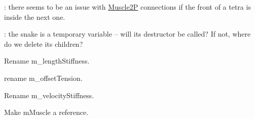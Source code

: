 \begin{DoxyRefList}
\-: there seems to be an issue with \hyperlink{class_muscle2_p}{Muscle2\-P} connections if the front of a tetra is inside the next one. 

\-: the snake is a temporary variable -- will its destructor be called? If not, where do we delete its children?  
\item[\label{todo__todo000003}%
\hypertarget{todo__todo000003}{}%
Member \hyperlink{class_impedance_control_a1c4d6e99303cc3e6934658db166de7ff}{Impedance\-Control\-:\-:\-\_\-length\-Stiffness} ]Rename m\-\_\-length\-Stiffness.  
\item[\label{todo__todo000002}%
\hypertarget{todo__todo000002}{}%
Member \hyperlink{class_impedance_control_a2c5a6ed274fdd9f44708c5c74c520bd7}{Impedance\-Control\-:\-:\-\_\-offset\-Tension} ]rename m\-\_\-offset\-Tension.  
\item[\label{todo__todo000004}%
\hypertarget{todo__todo000004}{}%
Member \hyperlink{class_impedance_control_af5bf17d7b651e84912e666b3bc3a25e4}{Impedance\-Control\-:\-:\-\_\-vel\-Stiffness} ]Rename m\-\_\-velocity\-Stiffness.  
\item[\label{todo__todo000001}%
\hypertarget{todo__todo000001}{}%
Member \hyperlink{class_impedance_control_a2fd876daa099a35a108e24d68a253382}{Impedance\-Control\-:\-:control} (\hyperlink{classtg_base_string}{tg\-Base\-String} $\ast$const m\-String, double delta\-Time\-Seconds, double new\-Position, double offset\-Vel=0)]Make m\-Muscle a reference. 


\end{DoxyRefList}
